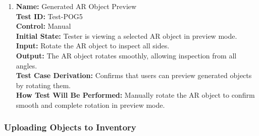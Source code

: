 \documentclass[12pt, titlepage]{article}
\begin{document}
\begin{enumerate}
  \item \textbf{Name:} Generated AR Object Preview \label{itm:Test-POG5} \\
        \textbf{Test ID:} Test-POG5 \\
        \textbf{Control:} Manual \\
        \textbf{Initial State:} Tester is viewing a selected AR object in preview mode. \\
        \textbf{Input:} Rotate the AR object to inspect all sides. \\
        \textbf{Output:} The AR object rotates smoothly, allowing inspection from all angles. \\
        \textbf{Test Case Derivation:} Confirms that users can preview generated objects by rotating them. \\
        \textbf{How Test Will Be Performed:} Manually rotate the AR object to confirm smooth and complete rotation in preview mode. \\

\end{enumerate}

\subsubsection{Uploading Objects to Inventory}
\end{document}
